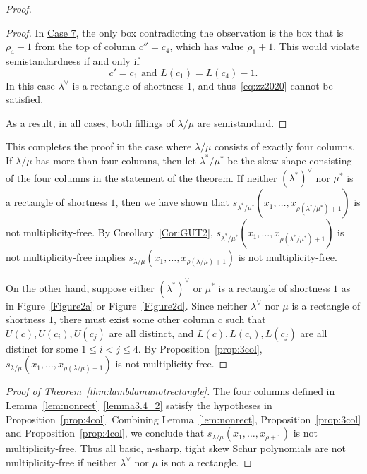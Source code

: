 \documentclass[ALCO,ThmDefs,Unicode,epreuves]{cedram}
\let\hyperlinka\hyperlink %
\begin{document}
\begin{proof}
\begin{proof}
In \hyperlinka{prop3.7case_7}{Case 7}, the only box contradicting the observation is the box that is $\rho_4-1$ from the top of column $c''=c_4$, which has value $\rho_1+1$. This would violate semistandardness if and only if
\begin{equation}
\label{eq:zz2020}
c'=c_1\text{ and }L(c_1) = L(c_4)-1.
\end{equation}
In this case $\lambda^\vee$ is a rectangle of shortness 1, and thus~\eqref{eq:zz2020} cannot be satisfied.

As a result, in all cases, both fillings of $\lambda/\mu$ are semistandard.
\end{proof}

This completes the proof in the case where $\lambda/\mu$ consists of exactly four columns. If $\lambda/\mu$ has more than four columns, then let $\lambda^*/\mu^*$ be the skew shape consisting of the four columns in the statement of the theorem. If neither $(\lambda^*)^\vee$ nor $\mu^*$ is a rectangle of shortness $1$, then we have shown that $s_{\lambda^*/\mu^*}(x_1,\dots, x_{\rho(\lambda^*/\mu^*) + 1})$ is not multiplicity-free. By Corollary~\ref{Cor:GUT2}, $s_{\lambda^*/\mu^*}(x_1,\dots, x_{\rho(\lambda^*/\mu^*) + 1})$ is not multiplicity-free implies $s_{\lambda/\mu}(x_1,\dots, x_{\rho(\lambda/\mu) + 1})$ is not multiplicity-free.

On the other hand, suppose either $(\lambda^*)^\vee$ or $\mu^*$ is a rectangle of shortness $1$ as in Figure~\ref{Figure2a} or Figure~\ref{Figure2d}. Since neither $\lambda^\vee$ nor $\mu$ is a rectangle of shortness $1$, there must exist some other column $c$ such that $U(c),U(c_i),U(c_j)$ are all distinct, and $L(c),L(c_i),L(c_j)$ are all distinct for some $1\leq i<j\leq 4$. By Proposition~\ref{prop:3col}, $s_{\lambda/\mu}(x_1,\dots, x_{\rho(\lambda/\mu)+1})$ is not multiplicity-free.
\end{proof}

\begin{proof}[Proof of Theorem~\ref{thm:lambdamunotrectangle}] 
The four columns defined in Lemma~\ref{lem:nonrect}~\ref{lemma3.4_2} satisfy the hypotheses in Proposition~\ref{prop:4col}. Combining Lemma~\ref{lem:nonrect}, Proposition~\ref{prop:3col} and Proposition~\ref{prop:4col}, we conclude that $s_{\lambda/\mu}(x_1,\ldots,x_{\rho+1})$ is not multiplicity-free. Thus all basic, n-sharp, tight skew Schur polynomials are not multiplicity-free if neither $\lambda^\vee$ nor $\mu$ is not a rectangle.
\end{proof}
\end{document}
